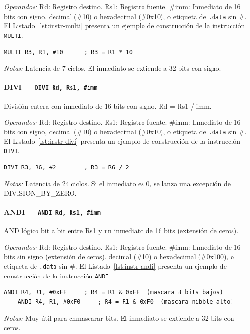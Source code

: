 \documentclass[../main.tex]{subfiles}
\begin{document}
\textit{Operandos:} Rd: Registro destino. Rs1: Registro fuente. \#imm: Inmediato de 16 bits con signo, decimal (\#10) o hexadecimal (\#0x10), o etiqueta de \texttt{.data} sin \#.
El Listado~\ref{lst:instr-multi} presenta un ejemplo de construcción de la instrucción \texttt{MULTI}.

\begin{lstlisting}[caption={MULTI},label={lst:instr-multi}]
	MULTI R3, R1, #10      ; R3 = R1 * 10
\end{lstlisting}
\textit{Notas:} Latencia de 7 ciclos. El inmediato se extiende a 32 bits con signo.

\paragraph*{DIVI --- \texttt{DIVI Rd, Rs1, \#imm}}
División entera con inmediato de 16 bits con signo. Rd = Rs1 / imm.

\textit{Operandos:} Rd: Registro destino. Rs1: Registro fuente. \#imm: Inmediato de 16 bits con signo, decimal (\#10) o hexadecimal (\#0x10), o etiqueta de \texttt{.data} sin \#.
El Listado~\ref{lst:instr-divi} presenta un ejemplo de construcción de la instrucción \texttt{DIVI}.

\begin{lstlisting}[caption={DIVI},label={lst:instr-divi}]
	DIVI R3, R6, #2        ; R3 = R6 / 2
\end{lstlisting}
\textit{Notas:} Latencia de 24 ciclos. Si el inmediato es 0, se lanza una excepción de DIVISION\_BY\_ZERO.

\paragraph*{ANDI --- \texttt{ANDI Rd, Rs1, \#imm}}
AND lógico bit a bit entre Rs1 y un inmediato de 16 bits (extensión de ceros).

\textit{Operandos:} Rd: Registro destino. Rs1: Registro fuente. \#imm: Inmediato de 16 bits sin signo (extensión de ceros), decimal (\#10) o hexadecimal (\#0x100), o etiqueta de \texttt{.data} sin \#.
El Listado~\ref{lst:instr-andi} presenta un ejemplo de construcción de la instrucción \texttt{ANDI}.

\begin{lstlisting}[caption={ANDI},label={lst:instr-andi}]
	ANDI R4, R1, #0xFF     ; R4 = R1 & 0xFF  (mascara 8 bits bajos)
	ANDI R4, R1, #0xF0     ; R4 = R1 & 0xF0  (mascara nibble alto)
\end{lstlisting}
\textit{Notas:} Muy útil para enmascarar bits. El inmediato se extiende a 32 bits con ceros.
\end{document}
